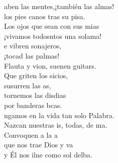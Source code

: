 \documentclass[12pt]{article}
\begin{document}
\begin{multicols*}{2}
\begin{cancion}
	aben las mentes,¡también las almas!\\
	los pies canos tras su pisa.\\
	Los ojos que sean con sus mias\\
	¡vivamos todosntos una solama!\\
	e vibren sonajeros, \\
¡tocad las palmas!\\
	Flauta y vion, suenen guitars.\\
	Que griten los sicios, \\
	susurren las as,\\
	tornemos las disdias\\
	por banderas bcas.\\
	ngamos en la vida tan solo Palabra.\\
	Nazcan nuestras is, todas, de ma.\\
	Convoquen a la a\\
	que nos trae Dios y va\\
	y Él nos ilne como sol delba.\\
\end{cancion}%


\end{multicols*}
\end{document}
